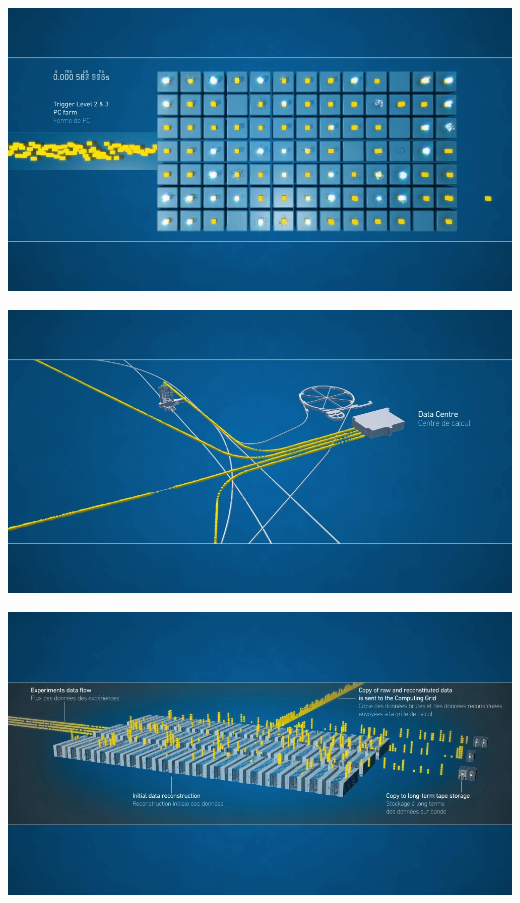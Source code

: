 \documentclass{beamer}
\begin{document}
\begin{frame}
    \includegraphics[width=\textwidth]{video/trigger2.png}
\end{frame}

\begin{frame}
    \includegraphics[width=\textwidth]{video/data_center.png}
\end{frame}

\begin{frame}
    \includegraphics[width=\textwidth]{video/processing.png}
\end{frame}
\end{document}
